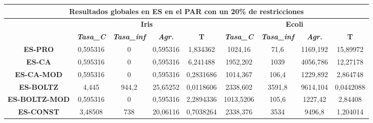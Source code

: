 \documentclass[12pt, spanish]{article}
\begin{document}
\begin{table}[H]
\hspace*{-1.2cm}\begin{tabular}{|c|c|c|c|c|c|c|c|c|}
\hline
\multicolumn{9}{|c|}{\textbf{Resultados globales en ES en el PAR con un 20\% de restricciones}}                                                                                                                                         \\ \hline
\multicolumn{1}{|l|}{\multirow{2}{*}{}} & \multicolumn{4}{c|}{\textbf{Iris}}                                                            & \multicolumn{4}{c|}{\textbf{Ecoli}}                                                           \\ \cline{2-9} 
\multicolumn{1}{|l|}{}                  & \textit{\textbf{Tasa\_C}} & \textit{\textbf{Tasa\_inf}} & \textit{\textbf{Agr.}} & \textbf{T} & \textit{\textbf{Tasa\_C}} & \textit{\textbf{Tasa\_inf}} & \textit{\textbf{Agr.}} & \textbf{T} \\ \hline
\textbf{ES-PRO}                         & 0,595316                  & 0                           & 0,595316               & 1,834362   & 1024,16                   & 71,6                        & 1169,192               & 15,89972   \\ \hline
\textbf{ES-CA}                          & 0,595316                  & 0                           & 0,595316               & 6,241488   & 1952,202                  & 1039                        & 4056,786               & 12,27178   \\ \hline
\textbf{ES-CA-MOD}                      & 0,595316                  & 0                           & 0,595316               & 0,2831686  & 1014,367                  & 106,4                       & 1229,892               & 2,864748   \\ \hline
\textbf{ES-BOLTZ}                       & 4,445                     & 944,2                       & 25,65252               & 0,0118606  & 2338,602                  & 3591,8                      & 9614,104               & 0,0442088  \\ \hline
\textbf{ES-BOLTZ-MOD}                   & 0,595316                  & 0                           & 0,595316               & 2,2894336  & 1013,5206                 & 105,6                       & 1227,42                & 2,84408    \\ \hline
\textbf{ES-CONST}                       & 3,48508                   & 738                         & 20,06116               & 0,7038264  & 2338,376                  & 3534                        & 9496,8                 & 1,204014   \\ \hline
\end{tabular}
\end{table}
\end{document}
